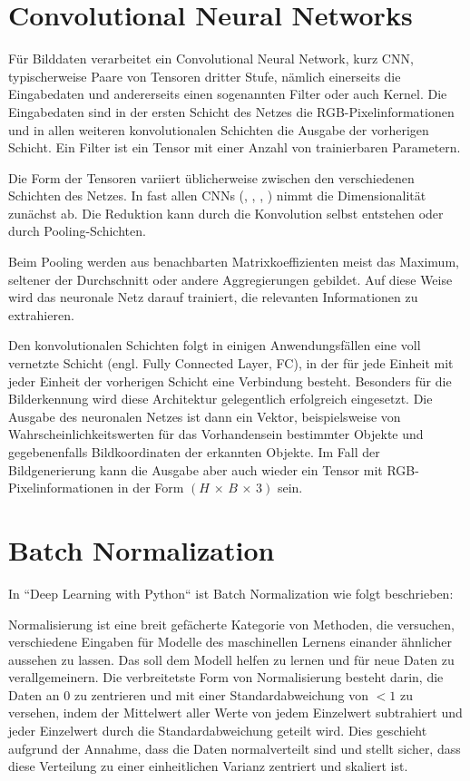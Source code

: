 \section{Convolutional Neural Networks}
\label{sec:cnn}
Für Bilddaten verarbeitet ein Convolutional Neural Network, kurz CNN, typischerweise Paare von Tensoren dritter Stufe, nämlich einerseits die Eingabedaten und andererseits einen sogenannten Filter oder auch Kernel. Die Eingabedaten sind in der ersten Schicht des Netzes die RGB-Pixelinformationen und in allen weiteren konvolutionalen Schichten die Ausgabe der vorherigen Schicht. Ein Filter ist ein Tensor mit einer Anzahl von trainierbaren Parametern.

Die Form der Tensoren variiert üblicherweise zwischen den verschiedenen Schichten des Netzes. In fast allen CNNs (\cite{isola2018imagetoimage}, \cite{goodfellow2016deeplearning}, \cite{Lecun99objectrecognition}, \cite{ronneberger2015unet}) nimmt die Dimensionalität zunächst ab. Die Reduktion kann durch die Konvolution selbst entstehen oder durch Pooling-Schichten.

Beim Pooling werden aus benachbarten Matrixkoeffizienten meist das Maximum, seltener der Durchschnitt oder andere Aggregierungen gebildet. Auf diese Weise wird das neuronale Netz darauf trainiert, die relevanten Informationen zu extrahieren. \cite{goodfellow2016deeplearning}

Den konvolutionalen Schichten folgt in einigen Anwendungsfällen eine voll vernetzte Schicht (engl. Fully Connected Layer, FC), in der für jede Einheit mit jeder Einheit der vorherigen Schicht eine Verbindung besteht. Besonders für die Bilderkennung wird diese Architektur gelegentlich erfolgreich eingesetzt. Die Ausgabe des neuronalen Netzes ist dann ein Vektor, beispielsweise von Wahrscheinlichkeitswerten für das Vorhandensein bestimmter Objekte und gegebenenfalls Bildkoordinaten der erkannten Objekte. Im Fall der Bildgenerierung kann die Ausgabe aber auch wieder ein Tensor mit RGB-Pixelinformationen in der Form $(H\,\times\,B\,\times\,3)$ sein.

\section{Batch Normalization}
In ``Deep Learning with Python`` \cite{chollet2021deep} ist Batch Normalization wie folgt beschrieben:

Normalisierung ist eine breit gefächerte Kategorie von Methoden, die versuchen, verschiedene Eingaben für Modelle des maschinellen Lernens einander ähnlicher aussehen zu lassen. Das soll dem Modell helfen zu lernen und für neue Daten zu verallgemeinern. Die verbreitetste Form von Normalisierung besteht darin, die Daten an $0$ zu zentrieren und mit einer Standardabweichung von $<1$ zu versehen, indem der Mittelwert aller Werte von jedem Einzelwert subtrahiert und jeder Einzelwert durch die Standardabweichung geteilt wird. Dies geschieht aufgrund der Annahme, dass die Daten normalverteilt sind und stellt sicher, dass diese Verteilung zu einer einheitlichen Varianz zentriert und skaliert ist.


